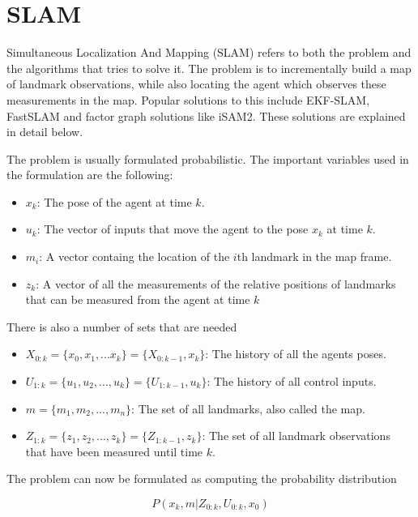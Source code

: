 \section{SLAM}

Simultaneous Localization And Mapping (SLAM)\cite{FirstSLAMMention}\cite{SLAMIntro} refers to both the problem and the algorithms that tries to solve it. The problem is to incrementally build a map of landmark observations, while also locating the agent which observes these measurements in the map. Popular solutions to this include EKF-SLAM\cite{EKFSLAM}, FastSLAM\cite{FastSLAM} and factor graph\cite{Dellaert} solutions like iSAM2\cite{iSAM2}. These solutions are explained in detail below. 

The problem is usually formulated probabilistic. The important variables used in the formulation are the following:

\begin{itemize}
    \item $x_k$: The pose of the agent at time $k$. 
    \item $u_k$: The vector of inputs that move the agent to the pose $x_k$ at time $k$.
    \item $m_i$: A vector containg the location of the $i$th landmark in the map frame. 
    \item $z_k$: A vector of all the measurements of the relative positions of landmarks that can be measured from the agent at time $k$ 
\end{itemize}

There is also a number of sets that are needed

\begin{itemize}
    \item $X_{0:k} = \{x_0,x_1,...x_k\} = \{X_{0:k-1},x_k\}$: The history of all the agents poses.
    \item $U_{1:k} = \{u_1,u_2,...,u_k\} = \{U_{1:k-1},u_k\}$: The history of all control inputs.
    \item $m=\{m_1,m_2,...,m_n\}$: The set of all landmarks, also called the map.
    \item $Z_{1:k}=\{z_1,z_2,...,z_k\} = \{Z_{1:k-1},z_k\}$: The set of all landmark observations that have been measured until time $k$.
\end{itemize}

The problem can now be formulated as computing the probability distribution 

\begin{equation}
    P(x_k,m|Z_{0:k},U_{0:k},x_0)
\end{equation}


